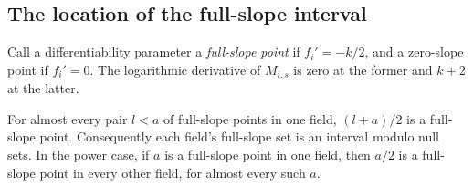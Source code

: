 \subsection{The location of the full-slope interval}

Call a differentiability parameter a \emph{full-slope point} if
$f_i'=-k/2$, and a zero-slope point if $f_i'=0$.
The logarithmic derivative of $M_{i,s}$ is zero at the former and
$k+2$ at the latter.

\begin{lemma}\label{f:midpoint}
For almost every pair $l<a$ of full-slope points in one field,
$(l+a)/2$ is a full-slope point. Consequently each field's
full-slope set is an interval modulo null sets. In the power case,
if $a$ is a full-slope point in one field, then $a/2$ is a
full-slope point in every other field, for almost every such $a$.
\end{lemma}

